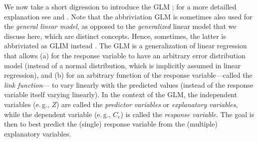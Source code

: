 %

We now take a short digression to introduce the \acf{GLM} \cite{Nelder1972,McCullagh1989};
for a more detailled explanation see  and .
Note that the abbriviation GLM is sometimes also used for the \emph{general linear model},
as opposed to the \emph{generalized} linear model that we discuss here, which are distinct concepts.
Hence, sometimes, the latter is abbriviated as GLIM instead \cite{McCullagh1989}.
The \ac{GLM} is a generalization of linear regression that allows
(a) for the response variable to have an arbitrary error distribution model
(instead of a normal distribution, which is implicitly assumed in linear regression),
and (b) for an arbitrary function of the response variable---called the \emph{link function}---%
to vary linearly with the predicted values (instead of the response variable itself varying linearly).
In the context of the \ac{GLM},
the independent variables (e.\,g., $Z$) are called the \emph{predictor variables} or \emph{explanatory variables},
while the dependent variable (e.\,g., $C_e$) is called the \emph{response variable}.
The goal is then to best predict the (single) response variable from the (multiple) explanatory variables.



